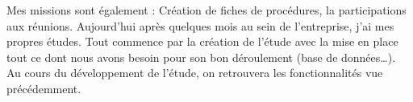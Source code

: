 Mes missions sont également :
Création de fiches de procédures, la participations aux réunions. 
Aujourd’hui après quelques mois au sein de l’entreprise, j’ai mes propres
études. Tout commence par la création de l’étude avec la mise en place tout ce
dont nous avons besoin pour son bon déroulement (base de données…). Au
cours du développement de l’étude, on retrouvera les fonctionnalités vue
précédemment.

